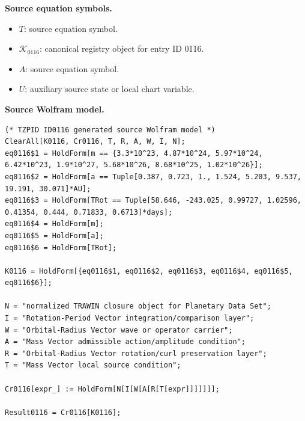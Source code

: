 \begin{minipage}[t]{0.49\linewidth}
\begingroup
\small
\raggedright
\textbf{Source equation symbols.}\par
\begin{itemize}[leftmargin=1.35em,itemsep=1pt,topsep=1pt,parsep=0pt]
    \item $T$: source equation symbol.
    \item $\mathcal{K}_{0116}$: canonical registry object for entry ID 0116.
    \item $A$: source equation symbol.
    \item $U$: auxiliary source state or local chart variable.
\end{itemize}
\endgroup
\end{minipage}\hfill
\begin{minipage}[t]{0.47\linewidth}
\begingroup
\scriptsize
\raggedright
\textbf{Source Wolfram model.}\par
\begin{Verbatim}[fontsize=\tiny,breaklines=true,breakanywhere=true]
(* TZPID ID0116 generated source Wolfram model *)
ClearAll[K0116, Cr0116, T, R, A, W, I, N];
eq0116$1 = HoldForm[m == {3.3*10^23, 4.87*10^24, 5.97*10^24, 6.42*10^23, 1.9*10^27, 5.68*10^26, 8.68*10^25, 1.02*10^26}];
eq0116$2 = HoldForm[a == Tuple[0.387, 0.723, 1., 1.524, 5.203, 9.537, 19.191, 30.071]*AU];
eq0116$3 = HoldForm[TRot == Tuple[58.646, -243.025, 0.99727, 1.02596, 0.41354, 0.444, 0.71833, 0.6713]*days];
eq0116$4 = HoldForm[m];
eq0116$5 = HoldForm[a];
eq0116$6 = HoldForm[TRot];

K0116 = HoldForm[{eq0116$1, eq0116$2, eq0116$3, eq0116$4, eq0116$5, eq0116$6}];

N = "normalized TRAWIN closure object for Planetary Data Set";
I = "Rotation-Period Vector integration/comparison layer";
W = "Orbital-Radius Vector wave or operator carrier";
A = "Mass Vector admissible action/amplitude condition";
R = "Orbital-Radius Vector rotation/curl preservation layer";
T = "Mass Vector local source condition";

Cr0116[expr_] := HoldForm[N[I[W[A[R[T[expr]]]]]]];

Result0116 = Cr0116[K0116];
\end{Verbatim}
\endgroup
\end{minipage}


